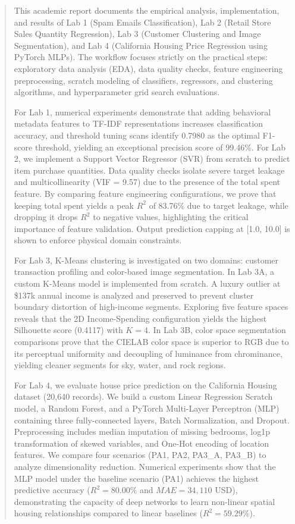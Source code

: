 \documentclass[12pt,a4paper]{article}
\begin{document}
\newpage
\begin{abstract}
This academic report documents the empirical analysis, implementation, and results of Lab 1 (Spam Emails Classification), Lab 2 (Retail Store Sales Quantity Regression), Lab 3 (Customer Clustering and Image Segmentation), and Lab 4 (California Housing Price Regression using PyTorch MLPs). The workflow focuses strictly on the practical steps: exploratory data analysis (EDA), data quality checks, feature engineering preprocessing, scratch modeling of classifiers, regressors, and clustering algorithms, and hyperparameter grid search evaluations. 

For Lab 1, numerical experiments demonstrate that adding behavioral metadata features to TF-IDF representations increases classification accuracy, and threshold tuning scans identify 0.7980 as the optimal F1-score threshold, yielding an exceptional precision score of 99.46\%. For Lab 2, we implement a Support Vector Regressor (SVR) from scratch to predict item purchase quantities. Data quality checks isolate severe target leakage and multicollinearity (VIF = 9.57) due to the presence of the total spent feature. By comparing feature engineering configurations, we prove that keeping total spent yields a peak $R^2$ of 83.76\% due to target leakage, while dropping it drops $R^2$ to negative values, highlighting the critical importance of feature validation. Output prediction capping at [1.0, 10.0] is shown to enforce physical domain constraints.

For Lab 3, K-Means clustering is investigated on two domains: customer transaction profiling and color-based image segmentation. In Lab 3A, a custom K-Means model is implemented from scratch. A luxury outlier at \$137k annual income is analyzed and preserved to prevent cluster boundary distortion of high-income segments. Exploring five feature spaces reveals that the 2D Income-Spending configuration yields the highest Silhouette score (0.4117) with $K=4$. In Lab 3B, color space segmentation comparisons prove that the CIELAB color space is superior to RGB due to its perceptual uniformity and decoupling of luminance from chrominance, yielding cleaner segments for sky, water, and rock regions.

For Lab 4, we evaluate house price prediction on the California Housing dataset (20,640 records). We build a custom Linear Regression Scratch model, a Random Forest, and a PyTorch Multi-Layer Perceptron (MLP) containing three fully-connected layers, Batch Normalization, and Dropout. Preprocessing includes median imputation of missing bedrooms, log1p transformation of skewed variables, and One-Hot encoding of location features. We compare four scenarios (PA1, PA2, PA3\_A, PA3\_B) to analyze dimensionality reduction. Numerical experiments show that the MLP model under the baseline scenario (PA1) achieves the highest predictive accuracy ($R^2 = 80.00\%$ and $MAE = 34,110$ USD), demonstrating the capacity of deep networks to learn non-linear spatial housing relationships compared to linear baselines ($R^2 = 59.29\%$).
\end{abstract}
\end{document}
